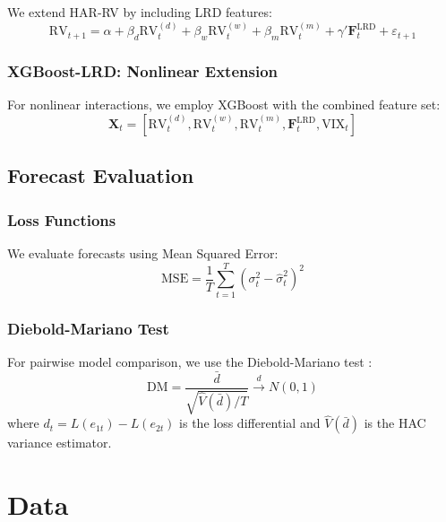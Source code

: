 \documentclass[12pt,a4paper]{article}
\newcommand{\RV}{\text{RV}}
\newcommand{\VIX}{\text{VIX}}
\newcommand{\MSE}{\text{MSE}}
\begin{document}
We extend HAR-RV by including LRD features:
\begin{equation}
    \RV_{t+1} = \alpha + \beta_d \RV_t^{(d)} + \beta_w \RV_t^{(w)} + \beta_m \RV_t^{(m)} + \gamma' \mathbf{F}_t^{\text{LRD}} + \varepsilon_{t+1}
\end{equation}

\subsubsection{XGBoost-LRD: Nonlinear Extension}

For nonlinear interactions, we employ XGBoost \citep{chen2016xgboost} with the combined feature set:
\begin{equation}
    \mathbf{X}_t = [\RV_t^{(d)}, \RV_t^{(w)}, \RV_t^{(m)}, \mathbf{F}_t^{\text{LRD}}, \VIX_t]
\end{equation}

\subsection{Forecast Evaluation}

\subsubsection{Loss Functions}

We evaluate forecasts using Mean Squared Error:
\begin{equation}
    \MSE = \frac{1}{T}\sum_{t=1}^T (\sigma_t^2 - \hat{\sigma}_t^2)^2
\end{equation}

\subsubsection{Diebold-Mariano Test}

For pairwise model comparison, we use the Diebold-Mariano test \citep{diebold1995comparing}:
\begin{equation}
    \text{DM} = \frac{\bar{d}}{\sqrt{\hat{V}(\bar{d})/T}} \xrightarrow{d} N(0,1)
\end{equation}
where $d_t = L(e_{1t}) - L(e_{2t})$ is the loss differential and $\hat{V}(\bar{d})$ is the HAC variance estimator.

\section{Data}
\label{sec:data}
\end{document}
